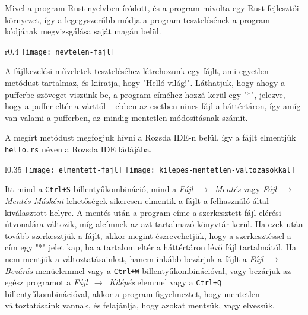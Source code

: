 

Mivel a program Rust nyelvben íródott, és a program mivolta egy Rust fejlesztői környezet,
így a legegyszerűbb módja a program tesztelésének a program kódjának megvizsgálása saját magán belül.


\begin{wrapfigure}{r}{0.4\textwidth}
    \centering
    \texttt{[image: nevtelen-fajl]}
\end{wrapfigure}

A fájlkezelési műveletek teszteléséhez létrehozunk egy fájlt, ami egyetlen metódust tartalmaz,
és kiíratja, hogy "Helló világ!". 
Láthatjuk, hogy ahogy a pufferbe szöveget viszünk be, a program címéhez hozzá kerül egy "*",
jelezve, hogy a puffer eltér a várttól -- ebben az esetben nincs fájl a háttértáron,
így amíg van valami a pufferben, az mindig mentetlen módosításnak számít.

A megírt metódust megfogjuk hívni a Rozsda IDE-n belül, így a fájlt elmentjük \texttt{hello.rs}
néven a Rozsda IDE ládájába.


\begin{wrapfigure}{l}{0.35\textwidth}
    \centering
    \texttt{[image: elmentett-fajl]}
    \texttt{[image: kilepes-mentetlen-valtozasokkal]}
\end{wrapfigure}

Itt mind a \texttt{Ctrl+S} billentyűkombináció, mind a \textit{Fájl $\,\to\,$ Mentés} vagy \textit{Fájl $\,\to\,$ Mentés Másként}
lehetőségek sikeresen elmentik a fájlt a felhasználó által kiválasztott helyre.
A mentés után a program címe a szerkesztett fájl elérési útvonalára változik,
míg alcímnek az azt tartalmazó könyvtár kerül.
Ha ezek után tovább szerkesztjük a fájlt, akkor megint észrevehetjük,
hogy a szerkesztéssel a cím egy "*" jelet kap, ha a tartalom eltér a háttértáron lévő fájl tartalmától.
Ha nem mentjük a változtatásainkat, 
hanem inkább bezárjuk a fájlt a \textit{Fájl $\,\to\,$ Bezárás} menüelemmel vagy a \texttt{Ctrl+W} billentyűkombinációval,
vagy bezárjuk az egész programot a \textit{Fájl $\,\to\,$ Kilépés} elemmel vagy a \texttt{Ctrl+Q} billentyűkombinációval,
akkor a program figyelmeztet, hogy mentetlen változtatásaink vannak,
és felajánlja, hogy azokat mentsük, vagy elvessük.

